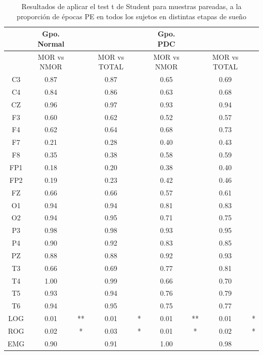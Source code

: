 \begin{table}
\centering
{\small
\begin{tabular}{c|cccc|cccc}
& Gpo. Normal &&&& Gpo. PDC &&&\\
\hline
&MOR vs NMOR&&MOR vs TOTAL&&MOR vs NMOR&&MOR vs TOTAL& \\
\hline
\hline
C3&0.87&&0.87&&0.65&&0.69& \\
C4&0.84&&0.86&&0.63&&0.68& \\
CZ&0.96&&0.97&&0.93&&0.94& \\
F3&0.60&&0.62&&0.52&&0.57& \\
F4&0.62&&0.64&&0.68&&0.73& \\
F7&0.21&&0.28&&0.40&&0.43& \\
F8&0.35&&0.38&&0.58&&0.59& \\
FP1&0.18&&0.20&&0.38&&0.40& \\
FP2&0.19&&0.23&&0.42&&0.46& \\
FZ&0.66&&0.66&&0.57&&0.61& \\
O1&0.94&&0.94&&0.81&&0.83& \\
O2&0.94&&0.95&&0.71&&0.75& \\
P3&0.98&&0.98&&0.93&&0.95& \\
P4&0.90&&0.92&&0.83&&0.85& \\
PZ&0.88&&0.88&&0.92&&0.93& \\
T3&0.66&&0.69&&0.77&&0.81& \\
T4&1.00&&0.99&&0.66&&0.70& \\
T5&0.93&&0.94&&0.76&&0.79& \\
T6&0.94&&0.95&&0.75&&0.77& \\
LOG&0.01&**&0.01&*&0.01&**&0.01&* \\
ROG&0.02&* &0.03&*&0.01&*&0.02&* \\
EMG&0.90&&0.91&&1.00&&0.98&
\end{tabular}
}
\caption{Resultados de aplicar el test t de Student para muestras pareadas, a la
proporci\'on de \'epocas PE en todos los sujetos en distintas etapas de sue\~no}
\label{apoio}
\end{table}


%
%

